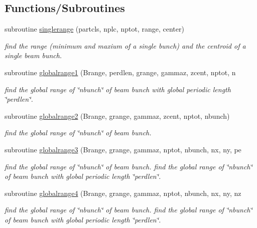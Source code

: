 \subsection*{Functions/\+Subroutines}
\begin{DoxyCompactItemize}
\item 
subroutine \mbox{\hyperlink{namespacerangerclass_a5e8eb23d6d5bf16cd2d36cd10ecf6f70}{singlerange}} (partcls, nplc, nptot, range, center)
\begin{DoxyCompactList}\small\item\em find the range (minimum and maxium of a single bunch) and the centroid of a single beam bunch. \end{DoxyCompactList}\item 
subroutine \mbox{\hyperlink{namespacerangerclass_a888ad4da7ecf705d91306f3922f210af}{globalrange1}} (Brange, perdlen, grange, gammaz, zcent, nptot, n
\begin{DoxyCompactList}\small\item\em find the global range of \char`\"{}nbunch\char`\"{} of beam bunch with global periodic length \char`\"{}perdlen\char`\"{}. \end{DoxyCompactList}\item 
subroutine \mbox{\hyperlink{namespacerangerclass_ad13f3def5e46e11250600f362cf040a6}{globalrange2}} (Brange, grange, gammaz, zcent, nptot, nbunch)
\begin{DoxyCompactList}\small\item\em find the global range of \char`\"{}nbunch\char`\"{} of beam bunch. \end{DoxyCompactList}\item 
subroutine \mbox{\hyperlink{namespacerangerclass_ad0b08fe4b8a1e2cbd7de8106b038e262}{globalrange3}} (Brange, grange, gammaz, nptot, nbunch, nx, ny, pe
\begin{DoxyCompactList}\small\item\em find the global range of \char`\"{}nbunch\char`\"{} of beam bunch. find the global range of \char`\"{}nbunch\char`\"{} of beam bunch with global periodic length \char`\"{}perdlen\char`\"{}. \end{DoxyCompactList}\item 
subroutine \mbox{\hyperlink{namespacerangerclass_aa1f850f78b90482f120d7104efc7bcdf}{globalrange4}} (Brange, grange, gammaz, nptot, nbunch, nx, ny, nz
\begin{DoxyCompactList}\small\item\em find the global range of \char`\"{}nbunch\char`\"{} of beam bunch. find the global range of \char`\"{}nbunch\char`\"{} of beam bunch with global periodic length \char`\"{}perdlen\char`\"{}. \end{DoxyCompactList}\end{DoxyCompactItemize}



